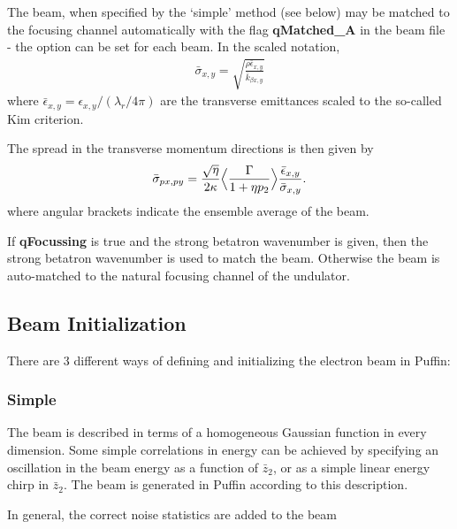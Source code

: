 \documentclass[12pt]{article}%
\begin{document}
The beam, when specified by the `simple' method (see below) may be matched to the focusing channel automatically with the flag {\bf qMatched\_A} in the beam file - the option can be set for each beam. In the scaled notation,
\begin{align}
\bar{\sigma}_{x,y} = \sqrt{  \frac{ \rho \bar{\epsilon}_{x,y} }{\bar{k}_{\beta x,y} }  }
\end{align}
where $\bar{\epsilon}_{x,y} = \epsilon_{x,y} / (\lambda_r / 4\pi)$ are the transverse emittances scaled to the so-called Kim criterion.



The spread in the transverse momentum directions is then given by 
\begin{align}
\bar{\sigma}_{px, py} = \frac{\sqrt{\eta}}{2 \kappa} \Bigl<  \frac{\Gamma}{1+\eta p_{2}}  \Bigr> \frac{ \bar{\epsilon}_{x,y} }{\bar{ \sigma}_{x,y}}.   \label{tmtch_spd} 
\end{align}
where angular brackets indicate the ensemble average of the beam.

If {\bf qFocussing} is true and the strong betatron wavenumber is given, then the strong betatron wavenumber is used to match the beam. Otherwise the beam is auto-matched to the natural focusing channel of the undulator. 



\subsection{Beam Initialization}

There are 3 different ways of defining and initializing the electron beam in Puffin:

\subsubsection{Simple}

The beam is described in terms of a homogeneous Gaussian function in every dimension. Some simple correlations in energy can be achieved by specifying an oscillation in the beam energy as a function of $\bar{z}_2$, or as a simple linear energy chirp in $\bar{z}_2$. The beam is generated in Puffin according to this description.

In general, the correct noise statistics are added to the beam 
\end{document}
